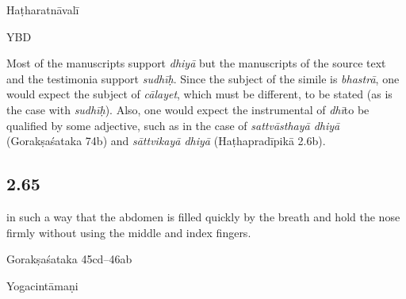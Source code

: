 \begin{ekdosis}
\begin{testimonia}[hp02_064]
Haṭharatnāvalī

\begin{versinnote}
\end{versinnote}

YBD

\begin{versinnote}
\end{versinnote}
\end{testimonia}

\begin{philcomm}[hp02_064]
Most of the manuscripts support \emph{dhiyā} but the manuscripts of the source text and the testimonia support \emph{sudhīḥ}. Since the subject of the simile is \emph{bhastrā}, one would expect the subject of \emph{cālayet}, which must be different, to be stated (as is the case with \emph{sudhīḥ}). Also, one would expect the instrumental of \emph{dhī}to be qualified by some adjective, such as in the case of \emph{sattvāsthayā dhiyā} (Gorakṣaśataka 74b) and \emph{sāttvikayā dhiyā} (Haṭhapradīpikā 2.6b).
\end{philcomm}

\subsection*{2.65}
\begin{translation}[hp02_065]
in such a way that the abdomen is filled quickly by the breath and  hold the nose firmly without using the middle and index fingers.
\end{translation}

\begin{sources}[hp02_065]
Gorakṣaśataka 45cd–46ab

\begin{versinnote}
\end{versinnote}
\end{sources}

\begin{testimonia}[hp02_065]
Yogacintāmaṇi


\end{testimonia}
\end{ekdosis}
